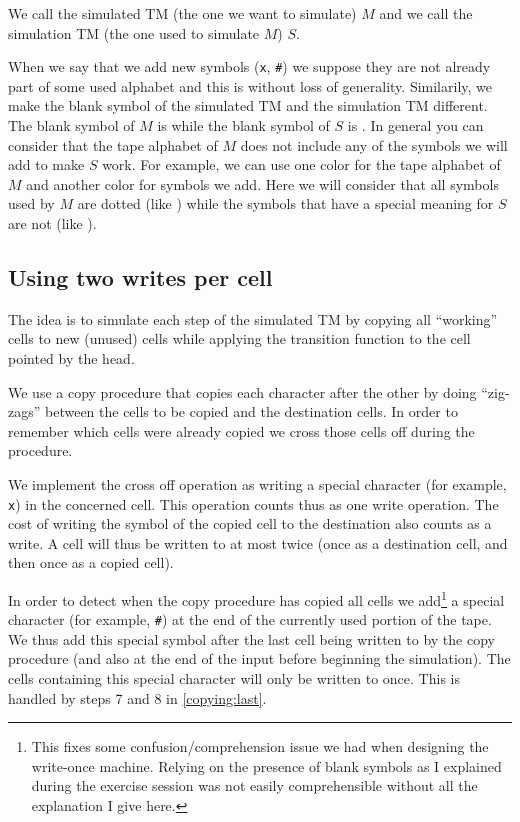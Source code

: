 \documentclass{article}
\newcommand{\0}{\texttt{\textvisiblespace}}
\newcommand{\°}{\obullet{\0}}
\newcommand{\X}{\texttt{x}}
\newcommand{\e}{\texttt{\#}}
\newcommand{\TM}{TM}
\begin{document}
We call the simulated \TM{} (the one we want to simulate) \(M\) and we
call the simulation \TM{} (the one used to simulate \(M\)) \(S\).

When we say that we add new symbols (\X{}, \e{}) we suppose they
are not already part of some used alphabet and this is without loss of
generality.
Similarily, we make the blank symbol of the simulated \TM{} and the
simulation \TM{} different. The blank symbol of \(M\)
is \°{} while the blank symbol of \(S\)
is \0{}. In general you can consider that the tape alphabet of \(M\)
does not include any of the symbols we will add to make \(S\) work.
For example, we can use one color for the tape alphabet of \(M\) and
another color for symbols we add. Here we will consider that all symbols used
by \(M\) are dotted (like \°{}) while the symbols that
have a special meaning for \(S\) are not (like \0{}).

\subsection{Using two writes per cell}
The idea is to simulate each step of the simulated
\TM{} by copying all ``working'' cells to new (unused) cells
while applying the transition function to the cell pointed by the head.

We use a copy procedure that copies each character after
the other by doing ``zig-zags'' between the cells to be copied and the destination
cells. In order to remember which cells were already copied we cross those
cells off during the procedure.

We implement the cross off operation as
writing a special character (for example, \X{}) in the concerned cell.
This operation counts thus as one write operation. The cost of writing the
symbol of the copied cell to the destination also counts as a write. A cell
will thus be written to at most twice (once as a destination cell, and then
once as a copied cell).

In order to detect when the copy procedure has copied all cells
we add\footnote{%
This fixes some confusion/comprehension issue we had when designing the
write-once machine. Relying on the presence of blank symbols as I explained
during the exercise session was not easily comprehensible without all the
explanation I give here.}
a special character (for example, \e)
at the end of the currently used portion of the tape.
We thus add this special symbol after the last cell being written to by the
copy procedure (and also at the end of the input before beginning the
simulation). The cells containing this special character will only be written to once.
This is handled by steps 7 and 8 in \ref{copying:last}.
\end{document}
